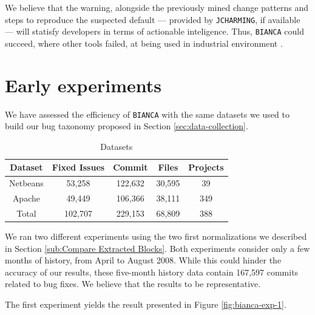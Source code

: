 We believe that the warning, alongside the previously mined change patterns and steps to reproduce the suspected default --- provided by {\tt JCHARMING}, if available --- will statisfy developers in terms of actionable inteligence.
Thus, {\tt BIANCA} could succeed, where other tools failed, at being used in industrial environment	\cite{Lewis2013}.


\section{Early experiments}

We have assessed the efficiency of {\tt BIANCA} with the same datasets we used to build our bug taxonomy proposed in Section \ref{sec:data-collection}.

\begin{table}[h]
\begin{center}
\begin{tabular}{@{}c|c|c|c|c@{}}
\textbf{Dataset} & \textbf{Fixed Issues} & \textbf{Commit} & \textbf{Files} & \textbf{Projects} \\ \hline \hline
Netbeans         & 53,258          & 122,632     & 30,595         & 39                \\
Apache           & 49,449          & 106,366     & 38,111         & 349               \\
Total            & 102,707         & 229,153     & 68,809         & 388               \\ \hline \hline

\end{tabular}
\end{center}

\caption{Datasets\label{table:datasets-bianca}}
\end{table}


We ran two different experiments using the two first normalizations we described in Section \ref{sub:Compare Extracted Blocks}. Both experiments consider only a few months of history, from April to August 2008. While this could hinder the accuracy of our results, these five-month  history data contain 167,597 commits related to bug fixes. We believe  that the results to be representative.

The first experiment yields the result presented in Figure \ref{fig:bianca-exp-1}.

